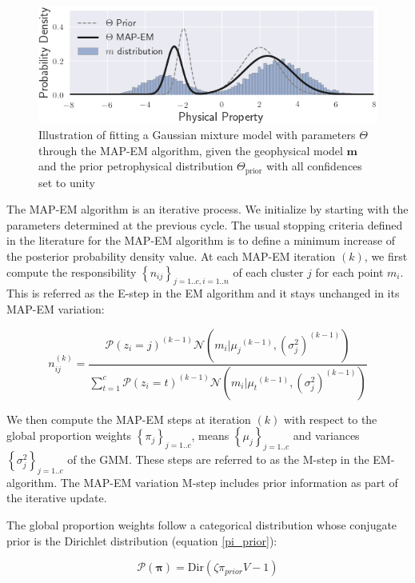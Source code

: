 \documentclass[extra]{gji} %
\begin{document}
\begin{figure}
    \includegraphics[width=\columnwidth]{./Fig/LowRes/example_MAPEM.png}
    \caption{Illustration of fitting a Gaussian mixture model with parameters $\Theta$ through the MAP-EM algorithm, given the geophysical model $\mathbf{m}$ and the prior petrophysical distribution $\Theta_{\text{prior}}$ with all confidences set to unity}
    \label{example_MAPEM}
\end{figure}

The MAP-EM algorithm is an iterative process. We initialize by starting with the parameters determined at the previous cycle. The usual stopping criteria defined in the literature for the MAP-EM algorithm is to define a minimum increase of the posterior probability density value. At each MAP-EM iteration $(k)$, we first compute the responsibility $\left\{n_{ij}\right\}_{j=1..c,i=1..n}$ of each cluster $j$ for each point ${m}_i$. This is referred as the E-step in the EM algorithm and it stays unchanged in its MAP-EM variation:

\begin{equation}
n_{ij}^{(k)} = \frac{\mathcal{P}(z_i=j)^{(k-1)}\mathcal{N}({m}_i|{\mu_j}^{(k-1)}, ({\sigma_j^2})^{(k-1)})}{ \sum_{t=1}^c \mathcal{P}(z_i=t)^{(k-1)} \mathcal{N}({m}_i|{\mu_t}^{(k-1)}, ({\sigma_j^2})^{(k-1)})} \label{responsibilities}
\end{equation}

We then compute the MAP-EM steps at iteration $(k)$ with respect to the global proportion weights $\left\{\pi_j\right\}_{j=1..c}$, means $\left\{\mu_j\right\}_{j=1..c}$ and variances $\left\{\sigma_j^2\right\}_{j=1..c}$ of the GMM. These steps are referred to as the M-step in the EM-algorithm. The MAP-EM variation M-step includes prior information as part of the iterative update.

The global proportion weights follow a categorical distribution whose conjugate prior is the Dirichlet distribution (equation \ref{pi_prior}):

\begin{equation}
\mathcal{P}(\mathbf{\pi}) = \text{Dir}({\zeta}\pi_{prior}V-1) \label{pi_prior}
\end{equation}
\end{document}
